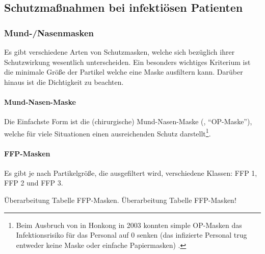 \subsection{Schutzmaßnahmen bei infektiösen Patienten}

\subsubsection{Mund-/Nasenmasken}

Es gibt verschiedene Arten von Schutzmasken, welche sich bezüglich ihrer
Schutzwirkung wesentlich unterscheiden. Ein besonders wichtiges Kriterium ist 
die minimale Größe der Partikel welche eine Maske ausfiltern kann. Darüber
hinaus ist die Dichtigkeit zu beachten. 

\paragraph{Mund-Nasen-Maske} 
Die Einfachste Form ist die (chirurgische) Mund-Nasen-Maske (,
"`OP-Maske"'), welche für viele Situationen einen ausreichenden Schutz
darstellt\footnote{Beim Ausbruch von  in Honkong in 2003 konnten simple
OP-Masken das Infektionsrisiko für das Personal auf 0 senken (das infizierte
Personal trug entweder keine Maske oder einfache Papiermasken)
\cite{Seto2003}.}.

\paragraph{FFP-Masken} Es gibt je nach Partikelgröße, die ausgefiltert wird,
verschiedene Klassen: FFP 1, FFP 2 und FFP 3. 
\begin{anfxwarning}[author=GABS]{Überarbeitung Tabelle FFP-Masken.}
   Überarbeitung Tabelle FFP-Masken!
\end{anfxwarning}


